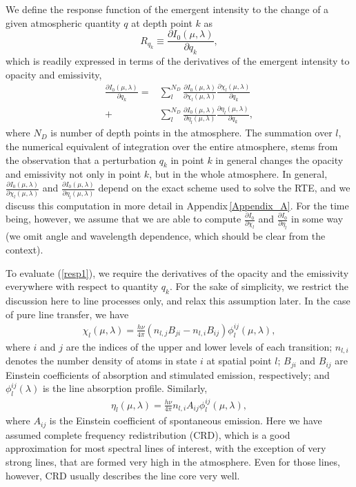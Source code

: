 \documentclass[referee]{aa}
\begin{document}
We define the response function of the emergent intensity to the change of a given atmospheric quantity $q$ at depth point $k$ as
\begin{equation}
 R_{q_k} \equiv \frac{\partial I_0(\mu,\lambda)}{\partial q_k},
\end{equation}
which is readily expressed in terms of the derivatives of the emergent intensity to opacity and emissivity, 
\begin{align}
 \frac{\partial I_0(\mu,\lambda)}{\partial q_k} = & \sum_l^{N_D} \frac{\partial I_0(\mu,\lambda)}{\partial \chi_l(\mu,\lambda)} \frac{\partial \chi_l(\mu,\lambda)}{\partial q_k} \nonumber \\
 + & \sum_l^{N_D} \frac{\partial I_0(\mu,\lambda)}{\partial \eta_l(\mu,\lambda)} \frac{\partial \eta_l(\mu,\lambda)}{\partial q_k},
 \label{resp1}
\end{align}
where $N_D$ is number of depth points in the atmosphere. The summation over $l$, the numerical equivalent of integration over the entire atmosphere, stems from the observation that a perturbation $q_k$ in point $k$ in general changes the opacity and emissivity not only in point $k$, but in the whole atmosphere. In general, $\frac{\partial I_0(\mu,\lambda)}{\partial \chi_l(\mu,\lambda)}$ and $\frac{\partial I_0(\mu,\lambda)}{\partial \eta_l(\mu,\lambda)}$ depend on the exact scheme used to solve the RTE, and we discuss this computation in more detail in Appendix\,\ref{Appendix_A}. For the time being, however, we  assume that we are able to compute $\frac{\partial I_0}{\partial \chi_l}$ and $\frac{\partial I_0}{\partial \eta_l}$ in some way (we  omit angle and wavelength dependence, which should be clear from the context).

To evaluate (\ref{resp1}), we require the derivatives of the opacity and the emissivity everywhere with respect to quantity $q_k$. For the sake of simplicity, we restrict the discussion here to line processes only, and relax this assumption later. In the case of pure line transfer, we have
\begin{align}
 \chi_l(\mu,\lambda) = \frac{h\nu}{4\pi}(n_{l,j} B_{ji} - n_{l,i}B_{ij}) \phi^{ij}_l(\mu,\lambda),
\end{align}
where $i$ and $j$ are the indices of the upper and lower levels of each transition; $n_{l,i}$ denotes the number density of atoms in state $i$ at spatial point $l$; $B_{ji}$ and $B_{ij}$ are Einstein coefficients of absorption and stimulated emission, respectively; and $\phi^{ij}_l(\lambda)$ is the line absorption profile. Similarly,
\begin{align}
 \eta_l(\mu,\lambda) = \frac{h\nu}{4\pi}n_{l,i}A_{ij} \phi^{ij}_l(\mu,\lambda), 
\end{align}
where $A_{ij}$ is the Einstein coefficient of spontaneous emission. Here we have assumed complete frequency redistribution (CRD), which is a good approximation for most spectral lines of interest, with the exception of very strong lines, that are formed very high in the atmosphere. Even for those lines, however, CRD usually describes the line core very well.
\end{document}
